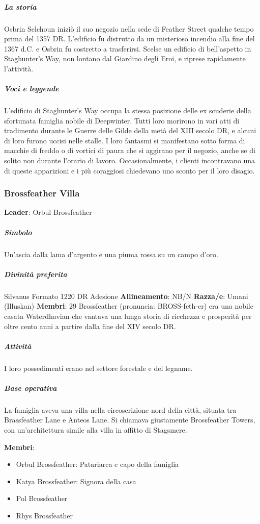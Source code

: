 \documentclass{article}
\begin{document}
\subparagraph{La storia}
Osbrin Selchoun iniziò il suo negozio nella sede di Feather Street qualche tempo prima del 1357 DR. L'edificio fu distrutto da un misterioso incendio alla fine del 1367 d.C. e Osbrin fu costretto a trasferirsi. Scelse un edificio di bell'aspetto in Staghunter's Way, non lontano dal Giardino degli Eroi, e riprese rapidamente l'attività.

\subparagraph{Voci e leggende}
L'edificio di Staghunter's Way occupa la stessa posizione delle ex scuderie della sfortunata famiglia nobile di Deepwinter. Tutti loro morirono in vari atti di tradimento durante le Guerre delle Gilde della metà del XIII secolo DR, e alcuni di loro furono uccisi nelle stalle. I loro fantasmi si manifestano sotto forma di macchie di freddo o di vortici di paura che si aggirano per il negozio, anche se di solito non durante l'orario di lavoro. Occasionalmente, i clienti incontravano una di queste apparizioni e i più coraggiosi chiedevano uno sconto per il loro disagio.


\subsubsection{Brossfeather Villa}
\textbf{Leader}:
Orbul Brossfeather\newline
\subparagraph{Simbolo}
Un'ascia dalla lama d'argento e una piuma rossa su un campo d'oro.
\subparagraph{Divinità preferita}
Silvanus
Formato
1220 DR
Adesione
\textbf{Allineamento}: NB/N\newline
\textbf{Razza/e}: Umani (Illuskan)\newline
\textbf{Membri}: 29\newline
Brossfeather (pronuncia:  BROSS-feth-er) era una nobile casata Waterdhavian che vantava una lunga storia di ricchezza e prosperità per oltre cento anni a partire dalla fine del XIV secolo DR.

\subparagraph{Attività}
I loro possedimenti erano nel settore forestale e del legname.

\subparagraph{Base operativa}
La famiglia aveva una villa nella circoscrizione nord della città, situata tra Brassfeather Lane e Anteos Lane. Si chiamava giustamente Brossfeather Towers, con un'architettura simile alla villa in affitto di Stagsmere.

\textbf{Membri}:
\begin{itemize}
    \item Orbul Brossfeather: Patariarca e capo della famiglia
    \item Katya Brossfeather: Signora della casa
    \item Pol Brossfeather
    \item Rhys Brossfeather
\end{itemize}
\end{document}
